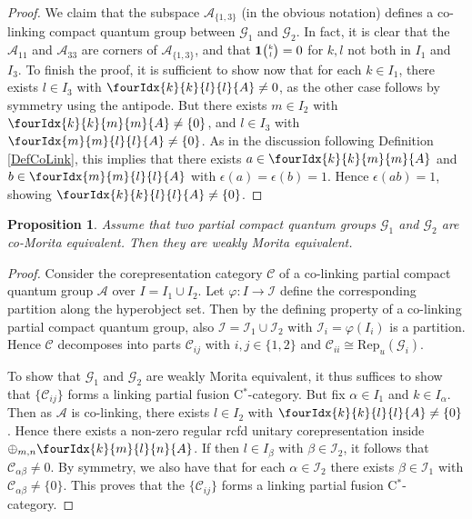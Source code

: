\documentclass[11pt]{article}
\newcommand{\CatC}{\mathcal{C}}
\newcommand{\CatCC}{\mathscr{C}}
\newcommand{\Rep}{\mathrm{Rep}}
\newcommand{\Grt}[3]{#1{\tiny {\begin{pmatrix} #2\\#3\end{pmatrix}}}}
\newcommand{\UnitC}[2]{\Grt{\mathbf{1}}{#1}{#2}}
\newcommand{\Gr}[5]{\fourIdx{#2}{#4}{#3}{#5}{#1}}%
\newtheorem{Prop}[Theorem]{Proposition}
\theoremstyle{definition}
\numberwithin{equation}{section}
\begin{document}
\begin{proof}
We claim that the subspace $\mathscr{A}_{\{1,3\}}$ (in the obvious notation) defines a co-linking compact quantum group between $\mathscr{G}_1$ and $\mathscr{G}_2$. In fact, it is clear that the $\mathscr{A}_{11}$ and $\mathscr{A}_{33}$ are corners of $\mathscr{A}_{\{1,3\}}$, and that $\UnitC{k}{l}=0$ for $k,l$ not both in $I_1$ and $I_{3}$. To finish the proof, it is sufficient to show now that for each $k\in I_1$, there exists $l\in I_{3}$ with $\Gr{A}{k}{l}{k}{l}\neq 0$, as the other case follows by symmetry using the antipode. But there exists $m\in I_2$ with $\Gr{A}{k}{m}{k}{m} \neq \{0\}$, and $l\in I_3$ with $\Gr{A}{m}{l}{m}{l}\neq\{0\}$. As in the discussion following Definition \ref{DefCoLink}, this implies that there exists $a\in \Gr{A}{k}{m}{k}{m}$ and $b\in \Gr{A}{m}{l}{m}{l}$ with $\epsilon(a)=\epsilon(b)=1$. Hence $\epsilon(ab)=1$, showing $\Gr{A}{k}{l}{k}{l}\neq \{0\}$.
\end{proof} 

\begin{Prop}\label{PropCoWeak} Assume that two partial compact quantum groups $\mathscr{G}_1$ and $\mathscr{G}_2$ are co-Morita equivalent. Then they are weakly Morita equivalent.
\end{Prop} 
\begin{proof} 
Consider the corepresentation category $\CatCC$ of a co-linking partial compact quantum group $\mathscr{A}$ over $I = I_1\cup I_2$. Let $\varphi:I\rightarrow \mathscr{I}$ define the corresponding partition along the hyperobject set. Then by the defining property of a co-linking partial compact quantum group, also $\mathscr{I} = \mathscr{I}_1\cup \mathscr{I}_2$ with $\mathscr{I}_i=\varphi(I_i)$ is a partition. Hence $\CatCC$ decomposes into parts $\CatCC_{ij}$ with $i,j\in \{1,2\}$ and $\CatC_{ii}\cong \Rep_u(\mathscr{G}_i)$. 

To show that $\mathscr{G}_1$ and $\mathscr{G}_2$ are weakly Morita equivalent, it thus suffices to show that $\{\CatCC_{ij}\}$ forms a linking partial fusion C$^*$-category. But fix $\alpha\in I_1$ and $k\in I_{\alpha}$. Then as $\mathscr{A}$ is co-linking, there exists $l \in I_2$ with $\Gr{A}{k}{l}{k}{l}\neq \{0\}$. Hence there exists a non-zero regular rcfd unitary corepresentation inside $\oplus_{m,n}\Gr{A}{k}{l}{m}{n}$. If then $l\in I_{\beta}$ with $\beta\in \mathscr{I}_2$, it follows that $\CatC_{\alpha\beta}\neq 0$. By symmetry, we also have that for each $\alpha \in \mathscr{I}_2$ there exists $\beta \in \mathscr{I}_1$ with $\CatC_{\alpha\beta}\neq \{0\}$. This proves that the $\{\CatCC_{ij}\}$ forms a linking partial fusion C$^*$-category.
\end{proof}
\end{document}
